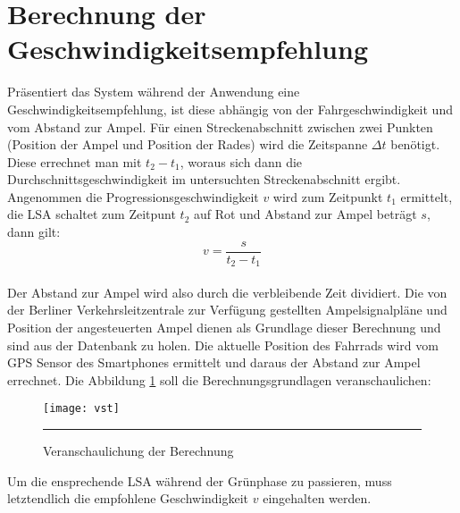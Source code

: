 \section{\label{sec:mathGrundlagen}Berechnung der Geschwindigkeitsempfehlung}
Präsentiert das System während der Anwendung eine Geschwindigkeitsempfehlung, ist diese abhängig von der Fahrgeschwindigkeit und vom Abstand zur Ampel. Für einen Streckenabschnitt zwischen zwei Punkten (Position der Ampel und Position der Rades) wird die Zeitspanne $\Delta t$ benötigt. Diese errechnet man mit $t_{2} - t_{1}$, woraus sich dann die Durchschnittsgeschwindigkeit im untersuchten Streckenabschnitt ergibt.\\ 
Angenommen die Progressionsgeschwindigkeit $v$ wird zum Zeitpunkt $t_{1}$ ermittelt, die \gls {LSA} schaltet zum Zeitpunt $t_{2}$ auf Rot und Abstand zur Ampel beträgt $s$, dann gilt: \\
\[ v = \frac{s}{t_{2} - t_{1}} \] \\
Der Abstand zur Ampel wird also durch die verbleibende Zeit dividiert. 
Die von der Berliner Verkehrsleitzentrale zur Verfügung gestellten Ampelsignalpläne und Position der angesteuerten Ampel dienen als Grundlage dieser Berechnung und sind aus der Datenbank zu holen. Die aktuelle Position des Fahrrads wird vom \gls{GPS} Sensor des \glspl{Smartphone} ermittelt und daraus der Abstand zur Ampel errechnet. Die Abbildung \ref{fig:vst} soll die Berechnungsgrundlagen veranschaulichen: 
\begin{figure}[H]  
    \centering  
    \texttt{[image: vst]}  
    \rule{35em}{0.5pt}   
    \caption[Berechnung Progressionsgeschwindigkeit]{Veranschaulichung der Berechnung}
    \label{fig:vst}
\end{figure}
Um die ensprechende \gls{LSA} während der Grünphase zu passieren, muss letztendlich die empfohlene Geschwindigkeit $v$ eingehalten werden.

